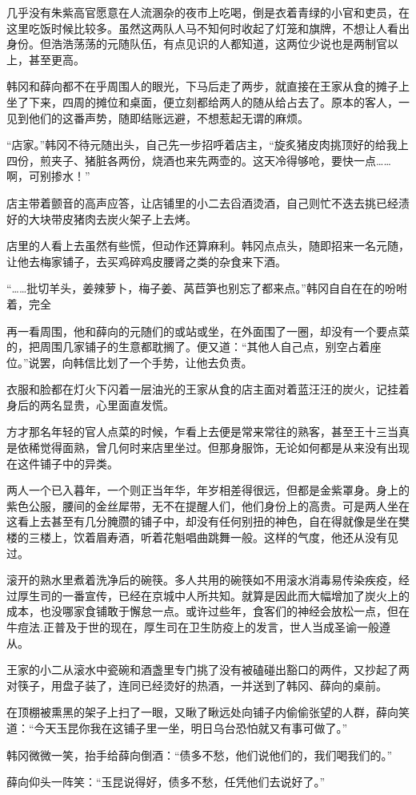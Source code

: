 几乎没有朱紫高官愿意在人流溷杂的夜市上吃喝，倒是衣着青绿的小官和吏员，在这里吃饭时候比较多。虽然这两队人马不知何时收起了灯笼和旗牌，不想让人看出身份。但浩浩荡荡的元随队伍，有点见识的人都知道，这两位少说也是两制官以上，甚至更高。

韩冈和薛向都不在乎周围人的眼光，下马后走了两步，就直接在王家从食的摊子上坐了下来，四周的摊位和桌面，便立刻都给两人的随从给占去了。原本的客人，一见到他们的这番声势，随即结账远避，不想惹起无谓的麻烦。

“店家。”韩冈不待元随出头，自己先一步招呼着店主，“旋炙猪皮肉挑顶好的给我上四份，煎夹子、猪脏各两份，烧酒也来先两壶的。这天冷得够呛，要快一点……啊，可别掺水！”

店主带着颤音的高声应答，让店铺里的小二去舀酒烫酒，自己则忙不迭去挑已经渍好的大块带皮猪肉去炭火架子上去烤。

店里的人看上去虽然有些慌，但动作还算麻利。韩冈点点头，随即招来一名元随，让他去梅家铺子，去买鸡碎鸡皮腰肾之类的杂食来下酒。

“……批切羊头，姜辣萝卜，梅子姜、莴苣笋也别忘了都来点。”韩冈自自在在的吩咐着，完全

再一看周围，他和薛向的元随们的或站或坐，在外面围了一圈，却没有一个要点菜的，把周围几家铺子的生意都耽搁了。便又道：“其他人自己点，别空占着座位。”说罢，向韩信比划了一个手势，让他去负责。

衣服和脸都在灯火下闪着一层油光的王家从食的店主面对着蓝汪汪的炭火，记挂着身后的两名显贵，心里面直发慌。

方才那名年轻的官人点菜的时候，乍看上去便是常来常往的熟客，甚至王十三当真是依稀觉得面熟，曾几何时来店里坐过。但那身服饰，无论如何都是从来没有出现在这件铺子中的异类。

两人一个已入暮年，一个则正当年华，年岁相差得很远，但都是金紫罩身。身上的紫色公服，腰间的金丝犀带，无不在提醒人们，他们身份上的高贵。可是两人坐在这看上去甚至有几分腌臜的铺子中，却没有任何别扭的神色，自在得就像是坐在樊楼的三楼上，饮着眉寿酒，听着花魁唱曲跳舞一般。这样的气度，他还从没有见过。

滚开的熟水里煮着洗净后的碗筷。多人共用的碗筷如不用滚水消毒易传染疾疫，经过厚生司的一番宣传，已经在京城中人所共知。就算是因此而大幅增加了炭火上的成本，也没哪家食铺敢于懈怠一点。或许过些年，食客们的神经会放松一点，但在牛痘法.正普及于世的现在，厚生司在卫生防疫上的发言，世人当成圣谕一般遵从。

王家的小二从滚水中瓷碗和酒盏里专门挑了没有被磕碰出豁口的两件，又抄起了两对筷子，用盘子装了，连同已经烫好的热酒，一并送到了韩冈、薛向的桌前。

在顶棚被熏黑的架子上扫了一眼，又瞅了瞅远处向铺子内偷偷张望的人群，薛向笑道：“今天玉昆你我在这铺子里一坐，明日乌台恐怕就又有事可做了。”

韩冈微微一笑，抬手给薛向倒酒：“债多不愁，他们说他们的，我们喝我们的。”

薛向仰头一阵笑：“玉昆说得好，债多不愁，任凭他们去说好了。”

